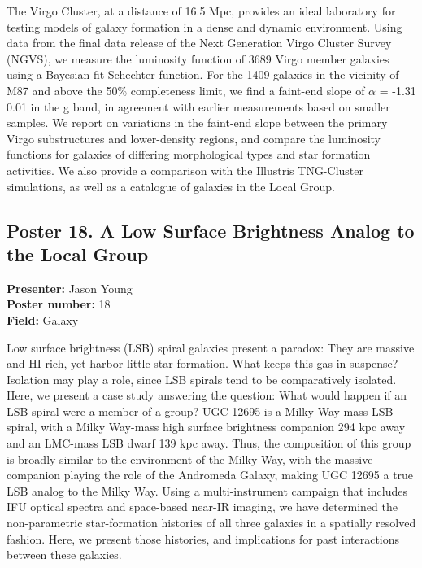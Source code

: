 The Virgo Cluster, at a distance of 16.5 Mpc, provides an ideal laboratory for testing models of galaxy formation in a dense and dynamic environment. Using data from the final data release of the Next Generation Virgo Cluster Survey (NGVS), we measure the luminosity function of 3689 Virgo member galaxies using a Bayesian fit Schechter function. For the 1409 galaxies in the vicinity of M87 and above the 50\% completeness limit, we find a faint-end slope of $\alpha$ = -1.31 0.01 in the g band, in agreement with earlier measurements based on smaller samples. We report on variations in the faint-end slope between the primary Virgo substructures and lower-density regions, and compare the luminosity functions for galaxies of differing morphological types and star formation activities. We also provide a comparison with the Illustris TNG-Cluster simulations, as well as a catalogue of galaxies in the Local Group.

\hypertarget{poster-abstract-talk-92}{}\label{poster-abstract-page-talk-92}
\subsection*{Poster 18. A Low Surface Brightness Analog to the Local Group}
\textbf{Presenter:} Jason Young\\
\textbf{Poster number:} 18\\
\textbf{Field:} Galaxy

Low surface brightness (LSB) spiral galaxies present a paradox: They are massive and HI rich, yet harbor little star formation. What keeps this gas in suspense? Isolation may play a role, since LSB spirals tend to be comparatively isolated. Here, we present a case study answering the question: What would happen if an LSB spiral were a member of a group? UGC 12695 is a Milky Way-mass LSB spiral, with a Milky Way-mass high surface brightness companion 294 kpc away and an LMC-mass LSB dwarf 139 kpc away. Thus, the composition of this group is broadly similar to the environment of the Milky Way, with the massive companion playing the role of the Andromeda Galaxy, making UGC 12695 a true LSB analog to the Milky Way. Using a multi-instrument campaign that includes IFU optical spectra and space-based near-IR imaging, we have determined the non-parametric star-formation histories of all three galaxies in a spatially resolved fashion. Here, we present those histories, and implications for past interactions between these galaxies.

\hypertarget{poster-abstract-talk-238}{}\label{poster-abstract-page-talk-238}
